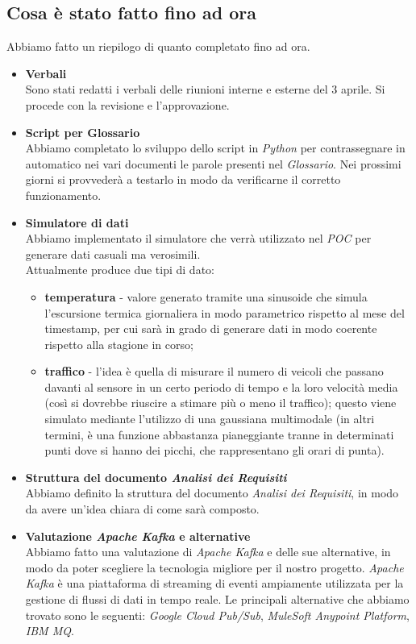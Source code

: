 \documentclass[italian,12pt]{article}
\begin{document}
\subsection{Cosa è stato fatto fino ad ora}
Abbiamo fatto un riepilogo di quanto completato fino ad ora.
\begin{itemize}
	\item \textbf{Verbali} \\
	Sono stati redatti i verbali delle riunioni interne e esterne del 3 aprile. Si procede con la revisione e l'approvazione.
	\item \textbf{Script per Glossario} \\
	Abbiamo completato lo sviluppo dello script in \textit{Python} per contrassegnare in automatico nei vari documenti le parole presenti nel \textit{Glossario}. Nei prossimi giorni si provvederà a testarlo in modo da verificarne il corretto funzionamento.
	\item \textbf{Simulatore di dati} \\
	Abbiamo implementato il simulatore che verrà utilizzato nel \textit{POC} per generare dati casuali ma verosimili. \\
	Attualmente produce due tipi di dato:
	\begin{itemize}
		\item \textbf{temperatura} - valore generato tramite una sinusoide che simula l'escursione termica giornaliera in modo parametrico rispetto al mese del timestamp, per cui sarà in grado di generare dati in modo coerente rispetto alla stagione in corso;
		\item \textbf{traffico} - l'idea è quella di misurare il numero di veicoli che passano davanti al sensore in un certo periodo di tempo e la loro velocità media (così si dovrebbe riuscire a stimare più o meno il traffico); questo viene simulato mediante l'utilizzo di una gaussiana multimodale (in altri termini, è una funzione abbastanza pianeggiante tranne in determinati punti dove si hanno dei picchi, che rappresentano gli orari di punta).
	\end{itemize}
	\item \textbf{Struttura del documento \textit{Analisi dei Requisiti}} \\
	Abbiamo definito la struttura del documento \textit{Analisi dei Requisiti}, in modo da avere un'idea chiara di come sarà composto.
	\item \textbf{Valutazione \textit{Apache Kafka} e alternative} \\
	Abbiamo fatto una valutazione di \textit{Apache Kafka} e delle sue alternative, in modo da poter scegliere la tecnologia migliore per il nostro progetto. \textit{Apache Kafka} è una piattaforma di streaming di eventi ampiamente utilizzata per la gestione di flussi di dati in tempo reale. Le principali alternative che abbiamo trovato sono le seguenti: \textit{Google Cloud Pub/Sub}, \textit{MuleSoft Anypoint Platform}, \textit{IBM MQ}. \\

\end{itemize}
\end{document}
